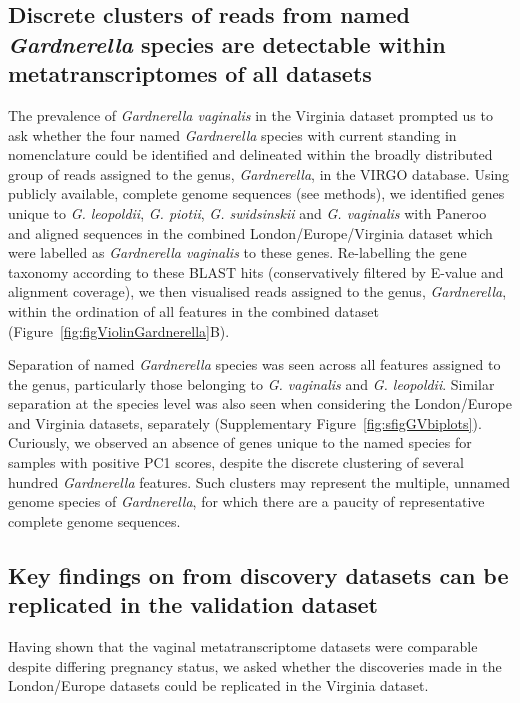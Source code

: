 \documentclass[sn-mathphys,Numbered]{sn-jnl}%
\begin{document}
\subsection{Discrete clusters of reads from named \textit{Gardnerella} species are detectable within metatranscriptomes of all datasets}\label{subsec:subsecGardnerella}

The prevalence of \textit{Gardnerella vaginalis} in the Virginia dataset prompted us to ask whether the four named \textit{Gardnerella} species with current standing in nomenclature could be identified and delineated within the broadly distributed group of reads assigned to the genus, \textit{Gardnerella}, in the VIRGO database. Using publicly available, complete genome sequences (see methods), we identified genes unique to \textit{G. leopoldii}, \textit{G. piotii}, \textit{G. swidsinskii} and \textit{G. vaginalis} with Paneroo \citep{Tonkin-Hill:2020aa} and aligned sequences in the combined London/Europe/Virginia dataset which were labelled as \textit{Gardnerella vaginalis} to these genes. Re-labelling the gene taxonomy according to these BLAST hits (conservatively filtered by E-value and alignment coverage), we then visualised reads assigned to the genus, \textit{Gardnerella}, within the ordination of all features in the combined dataset (Figure~\ref{fig:figViolinGardnerella}B).

Separation of named \textit{Gardnerella} species was seen across all features assigned to the genus, particularly those belonging to \textit{G. vaginalis} and \textit{G. leopoldii}. Similar separation at the species level was also seen when considering the London/Europe and Virginia datasets, separately (Supplementary Figure~\ref{fig:sfigGVbiplots}). Curiously, we observed an absence of genes unique to the named species for samples with positive PC1 scores, despite the discrete clustering of several hundred \textit{Gardnerella} features. Such clusters may represent the multiple, unnamed genome species of \textit{Gardnerella}, for which there are a paucity of representative complete genome sequences.

\subsection{Key findings on from discovery datasets can be replicated in the validation dataset} \label{subsec:subsecValidation}

Having shown that the vaginal metatranscriptome datasets were comparable despite differing pregnancy status, we asked whether the discoveries made in the London/Europe datasets could be replicated in the Virginia dataset.
\end{document}
